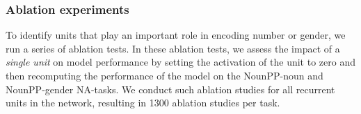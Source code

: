 \subsubsection{Ablation experiments}
To identify units that play an important role in encoding number or gender, we run a series of ablation tests.
In these ablation tests, we assess the impact of a \emph{single unit} on model performance by setting the activation of the unit to zero and then recomputing the performance of the model on the NounPP-noun and NounPP-gender NA-tasks. 
We conduct such ablation studies for all recurrent units in the network, resulting in 1300 ablation studies per task.
